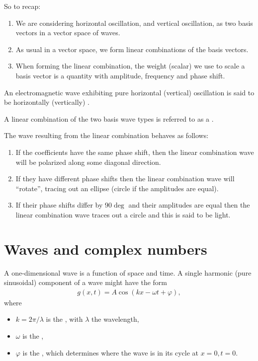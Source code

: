 So to recap:
\begin{enumerate}
\item We are considering horizontal oscillation, and vertical oscillation, as two basis vectors in a
  vector space of waves.
\item As usual in a vector space, we form linear combinations of the basis vectors.
\item When forming the linear combination, the weight (scalar) we use to scale a basis vector is a
  quantity with amplitude, frequency and phase shift.
\end{enumerate}

An electromagnetic wave exhibiting pure horizontal (vertical) oscillation is said to be horizontally
(vertically) .

A linear combination of the two basis wave types is referred to as a .

The wave resulting from the linear combination behaves as follows:
\begin{enumerate}
\item If the coefficients have the same phase shift, then the linear combination wave will be
  polarized along some diagonal direction.
\item If they have different phase shifts then the linear combination wave will ``rotate'', tracing
  out an ellipse (circle if the amplitudes are equal).
\item If their phase shifts differ by $90\deg$ and their amplitudes are equal then the linear
  combination wave traces out a circle and this is said to be  light.
\end{enumerate}


\newpage
\section{Waves and complex numbers}

A one-dimensional wave is a function of space and time. A single harmonic (pure sinusoidal)
component of a wave might have the form
\begin{align*}
  g(x, t) = A\cos(kx - \omega t + \varphi),
\end{align*}
where
\begin{itemize}
\item $k = 2\pi/\lambda$ is the , with $\lambda$ the wavelength,
\item $\omega$ is the ,
\item $\varphi$ is the , which determines where the wave is in its cycle at
  $x = 0, t = 0$.
\end{itemize}

